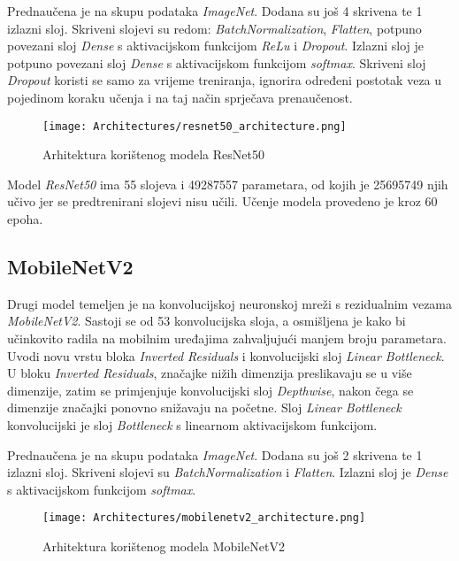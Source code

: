 \documentclass[conference, utf8]{IEEEtran}
\begin{document}
	Prednaučena je na skupu podataka \textit{ImageNet}. Dodana su još 4 skrivena te 1 izlazni sloj. Skriveni slojevi su redom: \textit{BatchNormalization}, \textit{Flatten}, potpuno povezani sloj \textit{Dense} s aktivacijskom funkcijom \textit{ReLu} i \textit{Dropout}. Izlazni sloj je potpuno povezani sloj \textit{Dense} s aktivacijskom funkcijom \textit{softmax}. Skriveni sloj \textit{Dropout} koristi se samo za vrijeme treniranja, ignorira određeni postotak veza u pojedinom koraku učenja i na taj način sprječava prenaučenost.

 	\begin{figure}[H]
		\centering
		\texttt{[image: Architectures/resnet50\_architecture.png]}
		\caption{Arhitektura korištenog modela ResNet50}
		\label{fig:resnet50model}
	\end{figure}
	
		
	Model \textit{ResNet50} ima 55 slojeva i 49287557 parametara, od kojih je 25695749 njih učivo jer se predtrenirani slojevi nisu učili. Učenje modela provedeno je kroz 60 epoha.
	
	
	\subsection{MobileNetV2}
	Drugi model temeljen je na konvolucijskoj neuronskoj mreži s rezidualnim vezama \textit{MobileNetV2}. Sastoji se od 53 konvolucijska sloja, a osmišljena je kako bi učinkovito radila na mobilnim uređajima zahvaljujući manjem broju parametara. Uvodi novu vrstu bloka \textit{Inverted Residuals} i konvolucijski sloj \textit{Linear Bottleneck}. U bloku \textit{Inverted Residuals}, značajke nižih dimenzija preslikavaju se u više dimenzije, zatim se primjenjuje konvolucijski sloj \textit{Depthwise}, nakon čega se dimenzije značajki ponovno snižavaju na početne. Sloj \textit{Linear Bottleneck} konvolucijski je sloj \textit{Bottleneck} s linearnom aktivacijskom funkcijom.
	
	Prednaučena je na skupu podataka \textit{ImageNet}. Dodana su još 2 skrivena te 1 izlazni sloj. Skriveni slojevi su \textit{BatchNormalization} i \textit{Flatten}. Izlazni sloj je \textit{Dense} s aktivacijskom funkcijom \textit{softmax}.
	
	\begin{figure}[H]
		\centering
		\texttt{[image: Architectures/mobilenetv2\_architecture.png]}
		\caption{Arhitektura korištenog modela MobileNetV2}
		\label{fig:mobilenetv2model}
	\end{figure}
	
\end{document}
